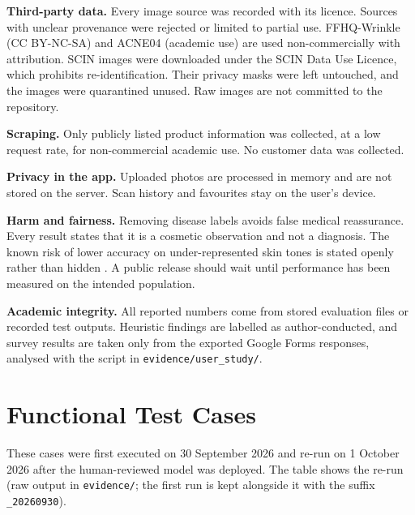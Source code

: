 \textbf{Third-party data.} Every image source was recorded with its licence. Sources with unclear provenance were rejected or limited to partial use. FFHQ-Wrinkle (CC BY-NC-SA) and ACNE04 (academic use) are used non-commercially with attribution. SCIN images were downloaded under the SCIN Data Use Licence, which prohibits re-identification. Their privacy masks were left untouched, and the images were quarantined unused. Raw images are not committed to the repository.

\textbf{Scraping.} Only publicly listed product information was collected, at a low request rate, for non-commercial academic use. No customer data was collected.

\textbf{Privacy in the app.} Uploaded photos are processed in memory and are not stored on the server. Scan history and favourites stay on the user's device.

\textbf{Harm and fairness.} Removing disease labels avoids false medical reassurance. Every result states that it is a cosmetic observation and not a diagnosis. The known risk of lower accuracy on under-represented skin tones is stated openly rather than hidden \citep{daneshjou2021,groh2021}. A public release should wait until performance has been measured on the intended population.

\textbf{Academic integrity.} All reported numbers come from stored evaluation files or recorded test outputs. Heuristic findings are labelled as author-conducted, and survey results are taken only from the exported Google Forms responses, analysed with the script in \texttt{evidence/user\_study/}.

\section{Functional Test Cases}
\label{app:tests}

These cases were first executed on 30 September 2026 and re-run on 1 October 2026 after the human-reviewed model was deployed. The table shows the re-run (raw output in \texttt{evidence/}; the first run is kept alongside it with the suffix \texttt{\_20260930}).


